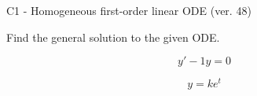 \begin{exercise}
  \begin{exerciseTitle}C1 - Homogeneous first-order linear ODE (ver. 48)\end{exerciseTitle}
  \begin{exerciseStatement}
    
Find the general solution to the given ODE.

    
\[y'-1y=0\]

  \end{exerciseStatement}
  \begin{exerciseAnswer}
    
\[y= k e^{t}\]

  \end{exerciseAnswer}
\end{exercise}